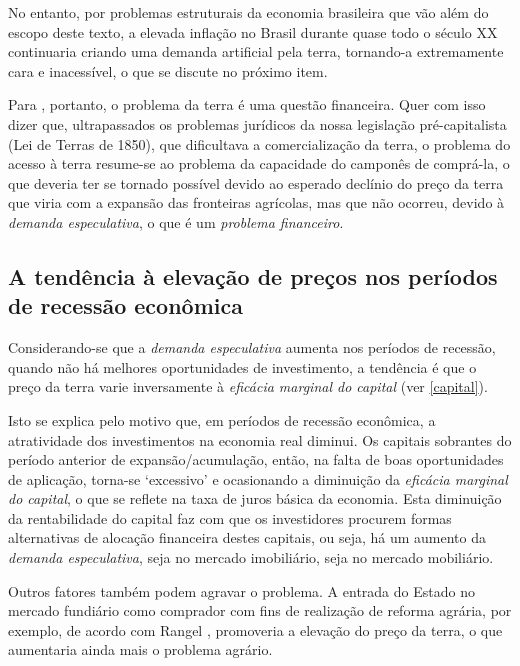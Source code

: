 \documentclass[
	12pt,				%
	oneside,			%
	a4paper,			%
	chapter=TITLE,		%
	section=TITLE,		%
	english,			%
	brazil				%
	]{abntex2}
\begin{document}
\begin{refsection}
No entanto, por problemas estruturais da economia brasileira que vão além do
escopo deste texto, a elevada inflação no Brasil durante quase todo o século XX
continuaria criando uma demanda artificial pela terra, tornando-a extremamente
cara e inacessível, o que se discute no próximo item.

Para \textcite[p.~138-139]{rangel1986b}, portanto, o problema da terra é uma questão
financeira. Quer com isso dizer que, ultrapassados os problemas jurídicos da
nossa legislação pré-capitalista (Lei de Terras de 1850), que dificultava a
comercialização da terra, o problema do acesso à terra resume-se ao problema da
capacidade do camponês de comprá-la, o que deveria ter se tornado possível
devido ao esperado declínio do preço da terra que viria com a expansão das
fronteiras agrícolas, mas que não ocorreu, devido à \emph{demanda especulativa}, o
que é um \emph{problema financeiro}.

\hypertarget{a-tenduxeancia-uxe0-elevauxe7uxe3o-de-preuxe7os-nos-peruxedodos-de-recessuxe3o-econuxf4mica}{%
\subsection{A tendência à elevação de preços nos períodos de recessão econômica}\label{a-tenduxeancia-uxe0-elevauxe7uxe3o-de-preuxe7os-nos-peruxedodos-de-recessuxe3o-econuxf4mica}}

Considerando-se que a \emph{demanda especulativa} aumenta nos períodos de recessão,
quando não há melhores oportunidades de investimento, a tendência é que o preço
da terra varie inversamente à \emph{eficácia marginal do capital} (ver \ref{capital}).

Isto se explica pelo motivo que, em períodos de recessão econômica, a
atratividade dos investimentos na economia real diminui. Os capitais sobrantes
do período anterior de expansão/acumulação, então, na falta de boas
oportunidades de aplicação, torna-se `excessivo' e ocasionando a diminuição da
\emph{eficácia marginal do capital}, o que se reflete na taxa de juros básica da
economia. Esta diminuição da rentabilidade do capital faz com que os
investidores procurem formas alternativas de alocação financeira destes
capitais, ou seja, há um aumento da \emph{demanda especulativa}, seja no mercado
imobiliário, seja no mercado mobiliário.

Outros fatores também podem agravar o problema. A entrada do Estado no mercado
fundiário como comprador com fins de realização de reforma agrária, por exemplo,
de acordo com Rangel \autocite*[128]{rangel1985}, promoveria a elevação do preço da
terra, o que aumentaria ainda mais o problema agrário.


\end{refsection}
\end{document}
